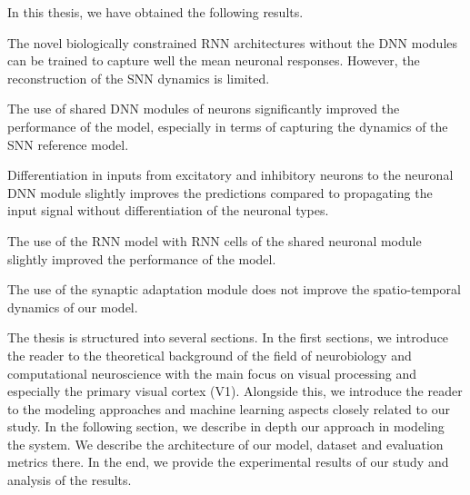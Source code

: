 In this thesis, we have obtained the following results. 
\begin{description}
    \item The novel biologically constrained RNN architectures without the DNN modules can be trained to capture well the mean neuronal responses. However, the reconstruction of the SNN dynamics is limited.
    \item The use of shared DNN modules of neurons significantly improved the performance of the model, especially in terms of capturing the dynamics of the SNN reference model.
    \item Differentiation in inputs from excitatory and inhibitory neurons to the neuronal DNN module slightly improves the predictions compared to propagating the input signal without differentiation of the neuronal types.
    \item The use of the RNN model with RNN cells of the shared neuronal module slightly improved the performance of the model.
    \item The use of the synaptic adaptation module does not improve the spatio-temporal dynamics of our model.
\end{description}

The thesis is structured into several sections. In the first sections,
we introduce the reader to the theoretical background of the field of neurobiology and computational
neuroscience with the main focus on visual processing and especially
the primary visual cortex (V1). Alongside this, we introduce the
reader to the modeling approaches and machine learning aspects
closely related to our study. In the following section, we
describe in depth our approach in modeling the system. We
describe the architecture of our model, dataset and evaluation
metrics there. In the end, we provide the experimental
results of our study and analysis of the results.
